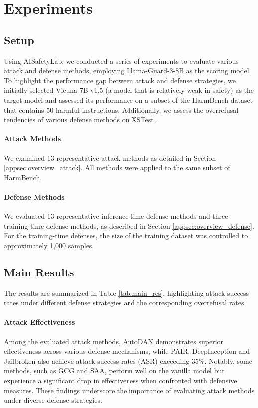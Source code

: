 
\section{Experiments}

\subsection{Setup}

Using AISafetyLab, we conducted a series of experiments to evaluate various attack and defense methods, employing Llama-Guard-3-8B as the scoring model. To highlight the performance gap between attack and defense strategies, we initially selected Vicuna-7B-v1.5 (a model that is relatively weak in safety) as the target model and assessed its performance on a subset of the HarmBench dataset that contains 50 harmful instructions. Additionally, we assess the overrefusal tendencies of various defense methods on XSTest \cite{rottger2024xstest}.

\paragraph{Attack Methods} We examined 13 representative attack methods as detailed in Section \ref{appsec:overview_attack}. All methods were applied to the same subset of HarmBench.

\paragraph{Defense Methods} We evaluated 13 representative inference-time defense methods and three training-time defense methods, as described in Section \ref{appsec:overview_defense}. For the training-time defenses, the size of the training dataset was controlled to approximately 1,000 samples.

\subsection{Main Results}



The results are summarized in Table \ref{tab:main_res}, highlighting attack success rates under different defense strategies and the corresponding overrefusal rates.

\paragraph{Attack Effectiveness}
Among the evaluated attack methods, AutoDAN demonstrates superior effectiveness across various defense mechanisms, while PAIR, DeepInception and Jailbroken also achieve attack success rates (ASR) exceeding 35\%. Notably, some methods, such as GCG and SAA, perform well on the vanilla model but experience a significant drop in effectiveness when confronted with defensive measures. These findings underscore the importance of evaluating attack methods under diverse defense strategies.

